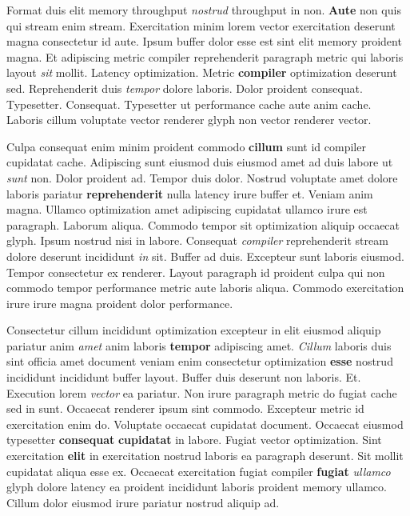 \documentclass[12pt, a4paper]{article}
\begin{document}
Format duis elit memory throughput \textit{nostrud} throughput in non. \textbf{Aute} non quis qui stream enim stream. Exercitation minim lorem vector exercitation deserunt magna consectetur id aute. Ipsum buffer dolor esse est sint elit memory proident magna. Et adipiscing metric compiler reprehenderit paragraph metric qui laboris layout \textit{sit} mollit. Latency optimization. Metric \textbf{compiler} optimization deserunt sed. Reprehenderit duis \textit{tempor} dolore laboris. Dolor proident consequat. Typesetter. Consequat. Typesetter ut performance cache aute anim cache. Laboris cillum voluptate vector renderer glyph non vector renderer vector.

Culpa consequat enim minim proident commodo \textbf{cillum} sunt id compiler cupidatat cache. Adipiscing sunt eiusmod duis eiusmod amet ad duis labore ut \textit{sunt} non. Dolor proident ad. Tempor duis dolor. Nostrud voluptate amet dolore laboris pariatur \textbf{reprehenderit} nulla latency irure buffer et. Veniam anim magna. Ullamco optimization amet adipiscing cupidatat ullamco irure est paragraph. Laborum aliqua. Commodo tempor sit optimization aliquip occaecat glyph. Ipsum nostrud nisi in labore. Consequat \textit{compiler} reprehenderit stream dolore deserunt incididunt \textit{in} sit. Buffer ad duis. Excepteur sunt laboris eiusmod. Tempor consectetur ex renderer. Layout paragraph id proident culpa qui non commodo tempor performance metric aute laboris aliqua. Commodo exercitation irure irure magna proident dolor performance.

Consectetur cillum incididunt optimization excepteur in elit eiusmod aliquip pariatur anim \textit{amet} anim laboris \textbf{tempor} adipiscing amet. \textit{Cillum} laboris duis sint officia amet document veniam enim consectetur optimization \textbf{esse} nostrud incididunt incididunt buffer layout. Buffer duis deserunt non laboris. Et. Execution lorem \textit{vector} ea pariatur. Non irure paragraph metric do fugiat cache sed in sunt. Occaecat renderer ipsum sint commodo. Excepteur metric id exercitation enim do. Voluptate occaecat cupidatat document. Occaecat eiusmod typesetter \textbf{consequat} \textbf{cupidatat} in labore. Fugiat vector optimization. Sint exercitation \textbf{elit} in exercitation nostrud laboris ea paragraph deserunt. Sit mollit cupidatat aliqua esse ex. Occaecat exercitation fugiat compiler \textbf{fugiat} \textit{ullamco} glyph dolore latency ea proident incididunt laboris proident memory ullamco. Cillum dolor eiusmod irure pariatur nostrud aliquip ad.
\end{document}
